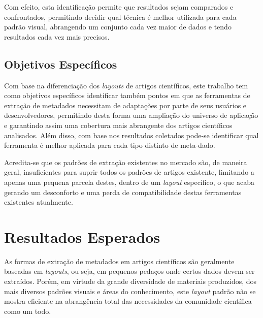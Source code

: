 Com efeito, esta identificação permite que resultados sejam comparados e confrontados, permitindo decidir qual técnica é melhor utilizada para cada padrão visual, abrangendo um conjunto cada vez maior de dados e tendo resultados cada vez mais precisos.


\subsection{Objetivos Específicos}
\label{ssec:specific-goals}

\begin{textedited}
Com base na diferenciação dos \textit{layouts} de artigos científicos, este trabalho tem como objetivos específicos identificar também pontos em que as ferramentas de extração de metadados necessitam de adaptações por parte de seus usuários e desenvolvedores, permitindo desta forma uma ampliação do universo de aplicação e garantindo assim uma cobertura mais abrangente dos artigos científicos analisados. Além disso, com base nos resultados coletados pode-se identificar qual ferramenta é melhor aplicada para cada tipo distinto de meta-dado.
\end{textedited}

Acredita-se que os padrões de extração existentes no mercado são, de maneira geral, insuficientes para suprir todos os padrões de artigos existente, limitando a apenas uma pequena parcela destes, dentro de um \textit{layout} específico, o que acaba gerando um desconforto e uma perda de compatibilidade destas ferramentas existentes atualmente.


\section{Resultados Esperados}
\label{sec:expected-results}

\begin{textedited}
As formas de extração de metadados em artigos científicos são geralmente baseadas em \textit{layouts}, ou seja, em pequenos pedaços onde certos dados devem ser extraídos. Porém, em virtude da grande diversidade de materiais produzidos, dos mais diversos padrões visuais e áreas do conhecimento, este \textit{layout} padrão não se mostra eficiente na abrangência total das necessidades da comunidade científica como um todo. 
\end{textedited}

